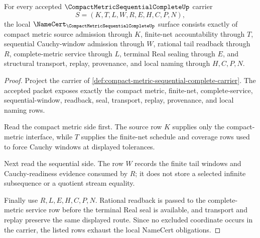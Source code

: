 \begin{theorem}
\label{thm:compact-metric-sequential-complete-obligations}
For every accepted $\CompactMetricSequentialCompleteUp$ carrier
$$
S=(K,T,L,W,R,E,H,C,P,N),
$$
the local $\NameCert_{\CompactMetricSequentialCompleteUp}$ surface consists exactly of compact metric source admission through $K$, finite-net accountability through $T$, sequential Cauchy-window admission through $W$, rational tail readback through $R$, complete-metric service through $L$, terminal Real sealing through $E$, and structural transport, replay, provenance, and local naming through $H,C,P,N$.
\end{theorem}
\begin{proof}
Project the carrier of \autoref{def:compact-metric-sequential-complete-carrier}. The accepted packet exposes exactly the compact metric, finite-net, complete-service, sequential-window, readback, seal, transport, replay, provenance, and local naming rows.

Read the compact metric side first. The source row $K$ supplies only the compact-metric interface, while $T$ supplies the finite-net schedule and coverage rows used to force Cauchy windows at displayed tolerances.

Next read the sequential side. The row $W$ records the finite tail windows and Cauchy-readiness evidence consumed by $R$; it does not store a selected infinite subsequence or a quotient stream equality.

Finally use $R,L,E,H,C,P,N$. Rational readback is passed to the complete-metric service row before the terminal Real seal is available, and transport and replay preserve the same displayed route. Since no excluded coordinate occurs in the carrier, the listed rows exhaust the local NameCert obligations.
\end{proof}

